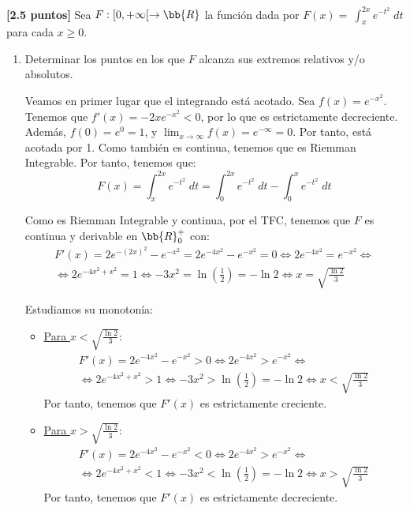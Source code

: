 \documentclass[12pt]{article}
\begin{document}
\begin{ejercicio}\textbf{[2.5 puntos]}
Sea $F:[0,+\infty[\to \bb{R}$ la función dada por $F(x)=~\int_x^{2x}e^{-t^2}\;dt$ para cada $x\geq 0$.
\begin{enumerate}
    \item Determinar los puntos en los que $F$ alcanza sus extremos relativos y/o absolutos.

    Veamos en primer lugar que el integrando está acotado. Sea $f(x)=e^{-x^2}$. Tenemos que $f'(x)=-2xe^{-x^2}<0$, por lo que es estrictamente decreciente. Además, $f(0)=e^0=1$, y $\lim_{x\to \infty}f(x)=e^{-\infty}=0$. Por tanto, está acotada por 1. Como también es continua, tenemos que es Riemman Integrable. Por tanto, tenemos que:
    \begin{equation*}
        F(x)=\int_x^{2x}e^{-t^2}\;dt
        = \int_0^{2x}e^{-t^2}\;dt
        -
        \int_0^{x}e^{-t^2}\;dt
    \end{equation*}

    Como es Riemman Integrable y continua, por el TFC, tenemos que $F$ es continua y derivable en $\bb{R}^+_0$ con:
    \begin{multline*}
        F'(x)=2e^{-(2x)^2} -e^{-x^2}
        = 2e^{-4x^2} -e^{-x^2} = 0 \Longleftrightarrow 2e^{-4x^2}=e^{-x^2}
        \Longleftrightarrow \\ \Longleftrightarrow
        2e^{-4x^2+x^2} = 1
        \Longleftrightarrow -3x^2 = \ln\left(\frac{1}{2}\right) = -\ln 2 \Longleftrightarrow x=\sqrt{\frac{\ln 2}{3}}
    \end{multline*}

    Estudiamos su monotonía:
    \begin{itemize}
        \item \underline{Para $x<\sqrt{\frac{\ln 2}{3}}$}:
        \begin{multline*}
            F'(x)
            = 2e^{-4x^2} -e^{-x^2} > 0 \Longleftrightarrow 2e^{-4x^2}>e^{-x^2}
            \Longleftrightarrow \\ \Longleftrightarrow
            2e^{-4x^2+x^2} > 1
            \Longleftrightarrow -3x^2 > \ln\left(\frac{1}{2}\right) = -\ln 2 \Longleftrightarrow x<\sqrt{\frac{\ln 2}{3}}
        \end{multline*}
        Por tanto, tenemos que $F'(x)$ es estrictamente creciente.

        \item \underline{Para $x>\sqrt{\frac{\ln 2}{3}}$}:
        \begin{multline*}
            F'(x)
            = 2e^{-4x^2} -e^{-x^2} < 0 \Longleftrightarrow 2e^{-4x^2}>e^{-x^2}
            \Longleftrightarrow \\ \Longleftrightarrow
            2e^{-4x^2+x^2} < 1
            \Longleftrightarrow -3x^2 < \ln\left(\frac{1}{2}\right) = -\ln 2 \Longleftrightarrow x>\sqrt{\frac{\ln 2}{3}}
        \end{multline*}
        Por tanto, tenemos que $F'(x)$ es estrictamente decreciente.
    \end{itemize}


\end{enumerate}
\end{ejercicio}
\end{document}
